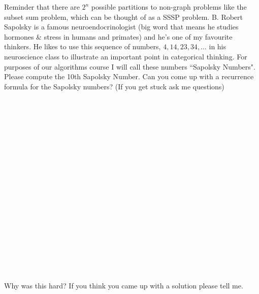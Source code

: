 \documentclass[12pt]{article}
\begin{document}
Reminder that there are $2^{n}$ possible partitions to non-graph problems 
like the subset sum problem, which can be thought of as a SSSP problem.
\newpage
\noindent B. Robert Sapolsky is a famous neuroendocrinologist (big word that means he studies hormones \& stress in humans and primates) and he's one of my favourite thinkers. He likes to use this sequence of numbers, $4, 14, 23, 34, \dots$ in his neuroscience class to illustrate an important point in categorical thinking. For purposes of our algorithms course I will call these numbers ``Sapolsky Numbers". Please compute the 10th Sapolsky Number. Can you come up with a recurrence formula for the Sapolsky numbers? (If you get stuck ask me questions)\\\\\\\\\\\\\\\\\\\\\\\\\\\\\\\\\\\\\\\\
Why was this hard? If you think you came up with a solution please tell me. 
\end{document}
